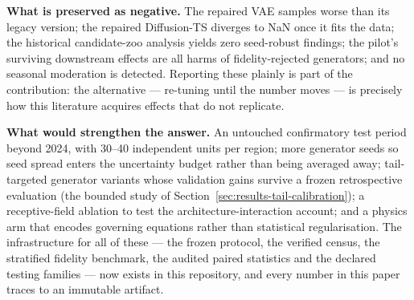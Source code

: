 \textbf{What is preserved as negative.} The repaired VAE samples worse than
its legacy version; the repaired Diffusion-TS diverges to NaN once it fits
the data; the historical candidate-zoo analysis yields zero seed-robust
findings; the pilot's surviving downstream effects are all harms of
fidelity-rejected generators; and no seasonal moderation is detected.
Reporting these plainly is part of the contribution: the alternative ---
re-tuning until the number moves --- is precisely how this literature
acquires effects that do not replicate.

\textbf{What would strengthen the answer.} An untouched confirmatory test
period beyond 2024, with 30--40 independent units per region; more generator
seeds so seed spread enters the uncertainty budget rather than being
averaged away; tail-targeted generator variants whose validation gains
survive a frozen retrospective evaluation (the bounded study of
Section~\ref{sec:results-tail-calibration}); a receptive-field ablation to
test the architecture-interaction account; and a physics arm that encodes
governing equations rather than statistical regularisation. The
infrastructure for all of these --- the frozen protocol, the verified census,
the stratified fidelity benchmark, the audited paired statistics and the
declared testing families --- now exists in this repository, and every
number in this paper traces to an immutable artifact.
